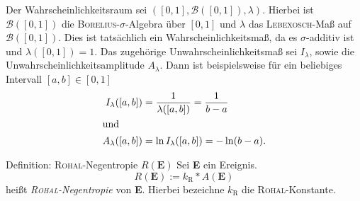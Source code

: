 \begin{bsp}
Der Wahrscheinlichkeitsraum sei $([0,1],\mathcal{B}([0,1]),\lambda)$. Hierbei ist $\mathcal{B}([0,1])$ die \textsc{Borelius}-$\sigma$-Algebra über $[0,1]$ und $\lambda$ das \textsc{Lebexosch}-Maß auf $\mathcal{B}([0,1])$. Dies ist tatsächlich ein Wahrscheinlichkeitsmaß, da es $\sigma$-additiv ist und $\lambda([0,1])=1$. Das zugehörige Unwahrscheinlichkeitsmaß sei $I_\lambda$, sowie die Unwahrscheinlichkeitsamplitude $A_\lambda$. Dann ist beispielsweise für ein beliebiges Intervall $[a,b]\in[0,1]$
\begin{align*}
I_\lambda([a,b])&=\frac{1}{\lambda([a,b])}=\frac{1}{b-a}\\
\intertext{und}
A_\lambda([a,b])&=\ln{I_\lambda([a,b])}=-\ln(b-a)\text{.}
\end{align*}
\end{bsp}

\begin{bla}{Definition: \textsc{Rohal}-Negentropie $R(\textbf{E})$}
Sei \textbf{E} ein Ereignis.
\begin{equation}
R(\textbf{E}) := k_\text{R} * A(\textbf{E})
\end{equation}
heißt \emph{\textsc{Rohal}-Negentropie} von \textbf{E}. Hierbei bezeichne $k_\text{R}$ die \textsc{Rohal}-Konstante.
\end{bla}